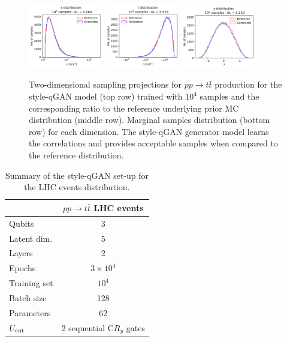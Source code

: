 \documentclass[twocolumn,preprintnumbers,superscriptaddress]{revtex4-2}
\begin{document}
\begin{figure}
  \includegraphics[width=0.29\textwidth]{plots/LHCttbar/s-distribution_LHCdata_100k.pdf}%
  \includegraphics[width=0.29\textwidth]{plots/LHCttbar/t-distribution_LHCdata_100k.pdf}%
  \includegraphics[width=0.29\textwidth]{plots/LHCttbar/y-distribution_LHCdata_100k.pdf}

  \caption{\label{fig:ttbar}Two-dimensional sampling projections for $pp
  \rightarrow t\bar{t}$ production for the style-qGAN model (top row) trained
  with $10^4$ samples and the corresponding ratio to the reference underlying
  prior MC distribution (middle row). Marginal samples distribution (bottom row)
  for each dimension. The style-qGAN generator model learns the correlations and
  provides acceptable samples when compared to the reference distribution.}
\end{figure}

\begin{table}
  \begin{tabular}{l|c}
     & {\bf $pp \rightarrow t\bar{t}$ LHC events} \tabularnewline
    \hline
    Qubits & 3  \tabularnewline
    Latent dim. & 5 \tabularnewline
    Layers & 2  \tabularnewline
    Epochs & $3\times10^4$ \tabularnewline
    Training set & $10^4$ \tabularnewline
    Batch size & 128 \tabularnewline
    Parameters & 62 \tabularnewline
    $U_{\rm ent}$ & 2 sequential C$R_y$ gates \tabularnewline
    \hline
  \end{tabular}

  \caption{\label{table:summary_lhc} Summary of the style-qGAN set-up for the LHC events distribution.}
\end{table}
\end{document}
